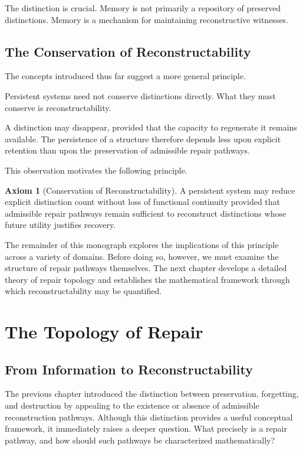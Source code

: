 \documentclass[12pt,oneside]{book}
\theoremstyle{plain} \newtheorem{theorem}{Theorem}[chapter] \newtheorem{lemma}[theorem]{Lemma} \newtheorem{proposition}[theorem]{Proposition} \newtheorem{corollary}[theorem]{Corollary}
\theoremstyle{definition} \newtheorem{definition}[theorem]{Definition} \newtheorem{axiom}[theorem]{Axiom} \newtheorem{construction}[theorem]{Construction}
\theoremstyle{remark} \newtheorem{remark}[theorem]{Remark} \newtheorem{example}[theorem]{Example}
\begin{document}
The distinction is crucial. Memory is not primarily a repository of preserved distinctions. Memory is a mechanism for maintaining reconstructive witnesses.

\section{The Conservation of Reconstructability}

The concepts introduced thus far suggest a more general principle.

Persistent systems need not conserve distinctions directly. What they must conserve is reconstructability.

A distinction may disappear, provided that the capacity to regenerate it remains available. The persistence of a structure therefore depends less upon explicit retention than upon the preservation of admissible repair pathways.

This observation motivates the following principle.

\begin{axiom}[Conservation of Reconstructability]

A persistent system may reduce explicit distinction count without loss of functional continuity provided that admissible repair pathways remain sufficient to reconstruct distinctions whose future utility justifies recovery.

\end{axiom}

The remainder of this monograph explores the implications of this principle across a variety of domains. Before doing so, however, we must examine the structure of repair pathways themselves. The next chapter develops a detailed theory of repair topology and establishes the mathematical framework through which reconstructability may be quantified.

\chapter{The Topology of Repair}

\section{From Information to Reconstructability}

The previous chapter introduced the distinction between preservation, forgetting, and destruction by appealing to the existence or absence of admissible reconstruction pathways. Although this distinction provides a useful conceptual framework, it immediately raises a deeper question. What precisely is a repair pathway, and how should such pathways be characterized mathematically?
\end{document}
